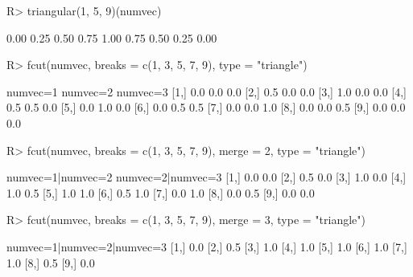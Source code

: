 \documentclass{article}\usepackage[]{graphicx}\usepackage[]{color}
\begin{document}
\begin{Schunk}
% --begin: "fcut.triangular"
\begin{Sinput}
R> triangular(1, 5, 9)(numvec)
\end{Sinput}
\begin{Soutput}
[1] 0.00 0.25 0.50 0.75 1.00 0.75 0.50 0.25 0.00
\end{Soutput}
%
% --end: "fcut.triangular"
\end{Schunk}

\begin{Schunk}
% --begin: "fcut.numeric2"
\begin{Sinput}
R> fcut(numvec, breaks = c(1, 3, 5, 7, 9), type = "triangle")
\end{Sinput}
\begin{Soutput}
      numvec=1 numvec=2 numvec=3
 [1,]      0.0      0.0      0.0
 [2,]      0.5      0.0      0.0
 [3,]      1.0      0.0      0.0
 [4,]      0.5      0.5      0.0
 [5,]      0.0      1.0      0.0
 [6,]      0.0      0.5      0.5
 [7,]      0.0      0.0      1.0
 [8,]      0.0      0.0      0.5
 [9,]      0.0      0.0      0.0
\end{Soutput}
%
% --end: "fcut.numeric2"
\end{Schunk}

\begin{Schunk}
% --begin: "fcut.merge"
\begin{Sinput}
R> fcut(numvec, breaks = c(1, 3, 5, 7, 9), merge = 2, type = "triangle")
\end{Sinput}
\begin{Soutput}
      numvec=1|numvec=2 numvec=2|numvec=3
 [1,]               0.0               0.0
 [2,]               0.5               0.0
 [3,]               1.0               0.0
 [4,]               1.0               0.5
 [5,]               1.0               1.0
 [6,]               0.5               1.0
 [7,]               0.0               1.0
 [8,]               0.0               0.5
 [9,]               0.0               0.0
\end{Soutput}
\begin{Sinput}
R> fcut(numvec, breaks = c(1, 3, 5, 7, 9), merge = 3, type = "triangle")
\end{Sinput}
\begin{Soutput}
      numvec=1|numvec=2|numvec=3
 [1,]                        0.0
 [2,]                        0.5
 [3,]                        1.0
 [4,]                        1.0
 [5,]                        1.0
 [6,]                        1.0
 [7,]                        1.0
 [8,]                        0.5
 [9,]                        0.0
\end{Soutput}
%
% --end: "fcut.merge"
\end{Schunk}
\end{document}
